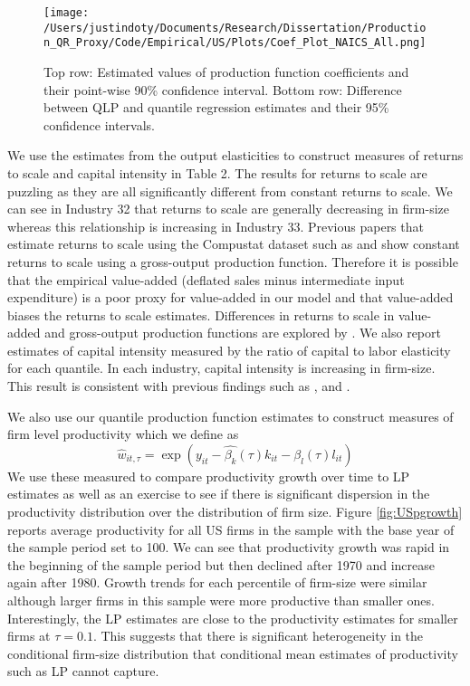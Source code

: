 \documentclass[11pt]{article}
\begin{document}
\begin{figure}[H]
\centering
\texttt{[image: /Users/justindoty/Documents/Research/Dissertation/Production\_QR\_Proxy/Code/Empirical/US/Plots/Coef\_Plot\_NAICS\_All.png]}
\caption{Top row: Estimated values of production function coefficients and their point-wise 90\% confidence interval. Bottom row: Difference between QLP and quantile regression estimates and their 95\% confidence intervals.}
\label{fig:USallcoef}
\end{figure}

We use the estimates from the output elasticities to construct measures of returns to scale and capital intensity in Table 2. The results for returns to scale are puzzling as they are all significantly different from constant returns to scale. We can see in Industry 32 that returns to scale are generally decreasing in firm-size whereas this relationship is increasing in Industry 33. Previous papers that estimate returns to scale using the Compustat dataset such as \cite{Keller2009} and \cite{mert} show constant returns to scale using a gross-output production function. Therefore it is possible that the empirical value-added (deflated sales minus intermediate input expenditure) is a poor proxy for value-added in our model and that value-added biases the returns to scale estimates. Differences in returns to scale in value-added and gross-output production functions are explored by \cite{Basu1997}. We also report estimates of capital intensity measured by the ratio of capital to labor elasticity for each quantile. In each industry, capital intensity is increasing in firm-size. This result is consistent with previous findings such as \cite{Holmes2008}, \cite{Kumar1999} and \cite{mert}.




We also use our quantile production function estimates to construct measures of firm level productivity which we define as
\begin{equation}
\hat{w}_{it,\tau}=\exp(y_{it}-\hat{\beta_{k}}(\tau)k_{it}-\hat{\beta_{l}}(\tau)l_{it})
\end{equation}
We use these measured to compare productivity growth over time to LP estimates as well as an exercise to see if there is significant dispersion in the productivity distribution over the distribution of firm size. Figure \ref{fig:USpgrowth} reports average productivity for all US firms in the sample with the base year of the sample period set to 100. We can see that productivity growth was rapid in the beginning of the sample period but then declined after 1970 and increase again after 1980. Growth trends for each percentile of firm-size were similar although larger firms in this sample were more productive than smaller ones. Interestingly, the LP estimates are close to the productivity estimates for smaller firms at $\tau=0.1$. This suggests that there is significant heterogeneity in the conditional firm-size distribution that conditional mean estimates of productivity such as LP cannot capture.
\end{document}
